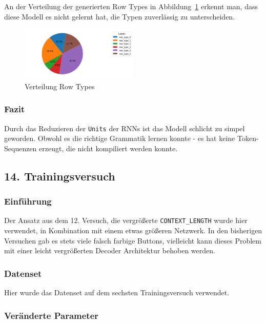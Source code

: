 \documentclass[pdftex,a4paper,halfparskip, article]{scrartcl}
\begin{document}
An der Verteilung der generierten Row Types in Abbildung~\ref{fig:bin16_row_type} erkennt man, dass diese Modell es nicht gelernt hat, die Typen zuverlässig zu unterscheiden.

\begin{figure}[h]
\centering
\includegraphics[width=0.5\textwidth]{predictions_bin16_predicted_row_type_distribution}
\caption{Verteilung Row Types}
\label{fig:bin16_row_type}
\end{figure}

\subsubsection*{Fazit}
Durch das Reduzieren der \texttt{Units} der RNNs ist das Modell schlicht zu simpel geworden. Obwohl es die richtige Grammatik lernen konnte - es hat keine Token-Sequenzen erzeugt, die nicht kompiliert werden konnte.

\subsection{14. Trainingsversuch}

\subsubsection*{Einführung}

Der Ansatz aus dem 12. Versuch, die vergrößerte \texttt{CONTEXT\_LENGTH} wurde hier verwendet, in Kombination mit einem etwas größeren Netzwerk. In den bisherigen Versuchen gab es stets viele falsch farbige Buttons, vielleicht kann dieses Problem mit einer leicht vergrößerten Decoder Architektur behoben werden.

\subsubsection*{Datenset}

Hier wurde das Datenset auf dem sechsten Trainingsversuch verwendet.

\subsubsection*{Veränderte Parameter}
\end{document}
